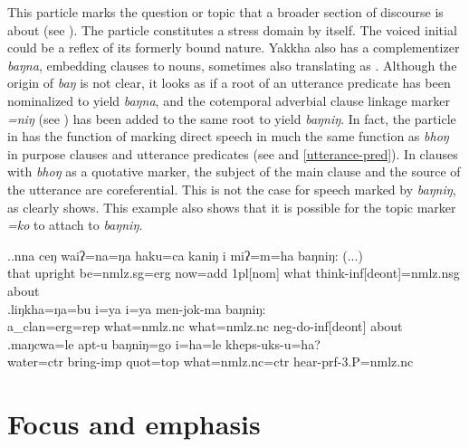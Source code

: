 This particle marks the question or topic that a broader section of discourse is about (see \Next). The particle constitutes a stress domain by itself. The voiced initial could be a reflex of its formerly bound nature. Yakkha also has a complementizer \emph{baŋna}, embedding clauses to nouns, sometimes also translating as . Although the origin of \emph{baŋ} is not clear, it looks as if a root of an utterance predicate has been  nominalized to yield \emph{baŋna}, and the cotemporal adverbial clause linkage marker  \emph{=niŋ} (see ) has been added to the same root to yield \emph{baŋniŋ}. In fact, the particle in \Next[c] has the function of marking direct speech in much the same function as \emph{bhoŋ} in purpose clauses and utterance predicates (see  and \ref{utterance-pred}). In clauses with  \emph{bhoŋ} as a quotative marker, the subject of the main clause and the source of the utterance are coreferential. This is not the case for speech marked by  \emph{baŋniŋ}, as \Next[c] clearly shows. This example also shows that it is possible for the topic marker \emph{=ko} to attach to  \emph{baŋniŋ}.

\ex.\ag.nna  ceŋ    waiʔ=na=ŋa      haku=ca   kaniŋ i  miʔ=m=ha baŋniŋ: (...)\\
that{\sc [nom]} upright be{\sc [3sg]=nmlz.sg=erg} now{\sc =add} {\sc 1pl[nom]} what think{\sc -inf[deont]=nmlz.nsg} about\\
 
\bg.\label{ex-bu}liŋkha=ŋa=bu         i=ya                i=ya                men-jok-ma              baŋniŋ:\\
a\_clan{\sc =erg=rep}  what{\sc =nmlz.nc} what{\sc =nmlz.nc} {\sc neg-}do{\sc -inf[deont]} about\\
 
\bg.maŋcwa=le          apt-u     baŋniŋ=go   i=ha=le        kheps-uks-u=ha? \\
water{\sc =ctr} bring{\sc -imp} {\sc quot=top} what{\sc =nmlz.nc=ctr} hear{\sc -prf-3.P=nmlz.nc} \\
 


\section{Focus and emphasis}\label{ptcl-foc}

